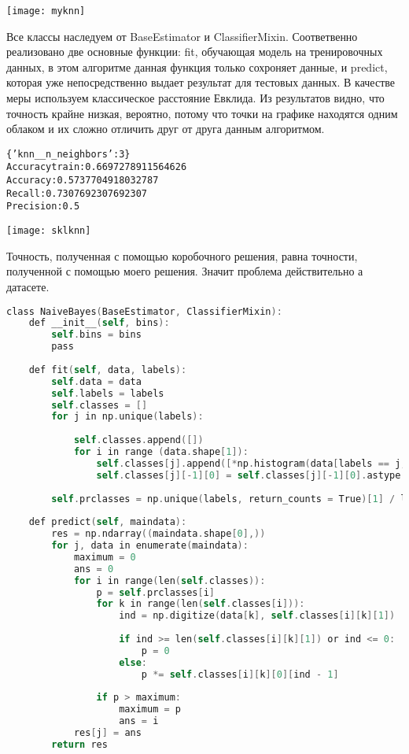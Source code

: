 \texttt{[image: myknn]} 

Все классы наследуем от BaseEstimator и ClassifierMixin. Соответвенно реализовано две основные функции: fit, обучающая модель на
тренировочных данных, в этом алгоритме данная функция только сохроняет данные, и predict, которая уже непосредственно выдает результат для
тестовых данных. В качестве меры используем классическое расстояние Евклида.
Из результатов видно, что точность крайне низкая, вероятно, потому что точки на графике находятся одним облаком и их сложно отличить друг от друга данным алгоритмом.

\begin{alltt}
\{'knn\_\_n\_neighbors': 3\}
Accuracy train: 0.6697278911564626
Accuracy: 0.5737704918032787
Recall: 0.7307692307692307
Precision: 0.5
\end{alltt}
\texttt{[image: sklknn]}

Точность, полученная с помощью коробочного решения, равна точности, полученной с помощью моего решения. Значит проблема действительно а датасете.



\begin{lstlisting}[language=C]
class NaiveBayes(BaseEstimator, ClassifierMixin):
    def __init__(self, bins):
        self.bins = bins
        pass
    
    def fit(self, data, labels):
        self.data = data
        self.labels = labels
        self.classes = []
        for j in np.unique(labels):
            
            self.classes.append([])
            for i in range (data.shape[1]):
                self.classes[j].append([*np.histogram(data[labels == j, i], bins = self.bins)])
                self.classes[j][-1][0] = self.classes[j][-1][0].astype('float64') / len(data[labels == j, i])
        
        self.prclasses = np.unique(labels, return_counts = True)[1] / len(labels)
        
    def predict(self, maindata):
        res = np.ndarray((maindata.shape[0],))
        for j, data in enumerate(maindata):
            maximum = 0
            ans = 0
            for i in range(len(self.classes)):
                p = self.prclasses[i]
                for k in range(len(self.classes[i])):
                    ind = np.digitize(data[k], self.classes[i][k][1])
                    
                    if ind >= len(self.classes[i][k][1]) or ind <= 0:
                        p = 0
                    else:
                        p *= self.classes[i][k][0][ind - 1]
                    
                if p > maximum:
                    maximum = p
                    ans = i
            res[j] = ans
        return res 
\end{lstlisting}

